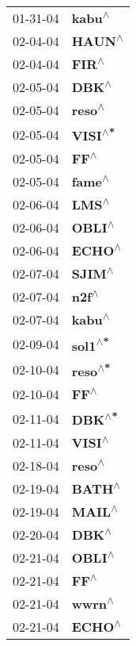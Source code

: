 \begin{supertabular}{p{0.08\textwidth}p{0.2\textwidth}}
 01-31-04 &    \textbf{kabu\textsuperscript{$\wedge$}} \\
 02-04-04 &    \textbf{HAUN\textsuperscript{$\wedge$}} \\
 02-04-04 &     \textbf{FIR\textsuperscript{$\wedge$}} \\
 02-05-04 &     \textbf{DBK\textsuperscript{$\wedge$}} \\
 02-05-04 &    \textbf{reso\textsuperscript{$\wedge$}} \\
 02-05-04 &   \textbf{VISI\textsuperscript{$\wedge$*}} \\
 02-05-04 &      \textbf{FF\textsuperscript{$\wedge$}} \\
 02-05-04 &    \textbf{fame\textsuperscript{$\wedge$}} \\
 02-06-04 &     \textbf{LMS\textsuperscript{$\wedge$}} \\
 02-06-04 &    \textbf{OBLI\textsuperscript{$\wedge$}} \\
 02-06-04 &    \textbf{ECHO\textsuperscript{$\wedge$}} \\
 02-07-04 &    \textbf{SJIM\textsuperscript{$\wedge$}} \\
 02-07-04 &     \textbf{n2f\textsuperscript{$\wedge$}} \\
 02-07-04 &    \textbf{kabu\textsuperscript{$\wedge$}} \\
 02-09-04 &   \textbf{sol1\textsuperscript{$\wedge$*}} \\
 02-10-04 &   \textbf{reso\textsuperscript{$\wedge$*}} \\
 02-10-04 &      \textbf{FF\textsuperscript{$\wedge$}} \\
 02-11-04 &    \textbf{DBK\textsuperscript{$\wedge$*}} \\
 02-11-04 &    \textbf{VISI\textsuperscript{$\wedge$}} \\
 02-18-04 &    \textbf{reso\textsuperscript{$\wedge$}} \\
 02-19-04 &    \textbf{BATH\textsuperscript{$\wedge$}} \\
 02-19-04 &    \textbf{MAIL\textsuperscript{$\wedge$}} \\
 02-20-04 &     \textbf{DBK\textsuperscript{$\wedge$}} \\
 02-21-04 &    \textbf{OBLI\textsuperscript{$\wedge$}} \\
 02-21-04 &      \textbf{FF\textsuperscript{$\wedge$}} \\
 02-21-04 &    \textbf{wwrn\textsuperscript{$\wedge$}} \\
 02-21-04 &    \textbf{ECHO\textsuperscript{$\wedge$}} \\

\end{supertabular}
